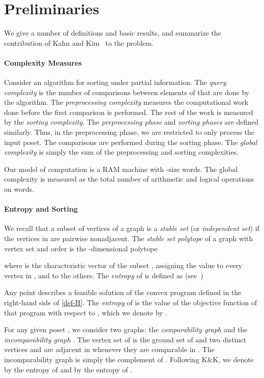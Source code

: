 \documentclass{article} \usepackage{fullpage}
\begin{document}
\section{Preliminaries}
\label{sec:prelim}

We give a number of definitions and basic results, and summarize the contribution of Kahn and Kim~\cite{KK95} to the problem. 

\paragraph*{Complexity Measures}

Consider an algorithm for sorting under partial information. The {\sl query complexity\/} is the number of comparisons between elements of  that are done by the algorithm. The {\sl preprocessing complexity\/} measures the computational work done before the first comparison is performed. The rest of the work is measured by the {\sl sorting complexity}. The {\sl preprocessing phase\/} and {\sl sorting phases\/} are defined similarly. Thus, in the preprocessing phase, we are restricted to only process the input poset. The comparisons are performed during the sorting phase. The {\sl global complexity\/} is simply the sum of the preprocessing and sorting complexities.

Our model of computation is a RAM machine with -size words. The global complexity is measured as the total number of arithmetic and logical operations on words.

\paragraph*{Entropy and Sorting}

We recall that a subset  of vertices of a graph is a {\sl stable set\/} (or {\sl independent set}) if the vertices in  are pairwise nonadjacent. The {\sl stable set polytope\/} of a graph  with vertex set  and order  is the -dimensional polytope

where  is the characteristic vector of the subset , assigning the value  to every vertex in , and  to the others. The {\sl entropy\/} of  is defined as (see~\cite{K73,CKLMS90})

Any point  describes a feasible solution of the convex program defined in the right-hand side of \eqref{def-H}. The {\sl entropy\/} of  is the value of the objective function of that program with respect to , which we denote by .

For any given poset , we consider two graphs: the {\sl comparability graph\/}  and the {\sl incomparability graph\/} . The vertex set of  is the ground set of  and two distinct vertices  and  are adjacent in  whenever they are comparable in . The incomparability graph  is simply the complement of . Following K\&K, we denote by  the entropy of  and by  the entropy of .
\end{document}

